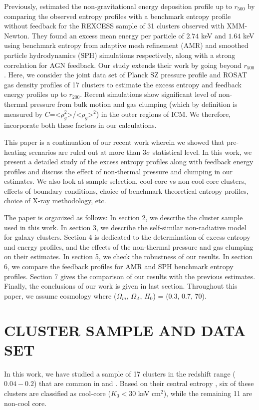 \documentclass[a4paper,fleqn,usenatbib]{mnras}
\begin{document}
Previously, \cite{Chaudhuri2012,Chaudhuri2013} estimated the non-gravitational energy deposition profile up to $r_{500}$
by comparing the observed entropy profiles with a benchmark entropy profile without feedback \citep{Voit2005} for the  REXCESS sample of 31 clusters \citep{10} observed with  XMM-Newton.  They found an excess mean energy per particle of $2.74$ keV and $1.64$ keV using benchmark entropy from adaptive mesh refinement (AMR) and smoothed particle hydrodynamics (SPH) simulations respectively, along with a strong correlation for AGN feedback. Our study extends their work
by going beyond $r_{500}$. Here, we consider the joint data set of Planck SZ pressure profile and  ROSAT gas density profiles of 17 clusters \citep{Eckert2013a,Eckert2013b,Planck2013a} to estimate the excess entropy and feedback energy profiles up to  $r_{200}$.  
Recent simulations show significant level of non-thermal pressure from bulk motion \citep{Rasia2004,Battaglia2012,Shi2015} and gas clumping (which by definition is
measured by $C$=<$\rho_g^2$>/<$\rho_g$>$^2$)  \citep{Nagai2011,Eckert2013a,Eckert2015,Battaglia2015} in the outer regions of ICM. We therefore, incorporate both these factors in our calculations.   

This paper is a continuation of our recent work \cite{Iqbal2016a} wherein we showed that pre-heating scenarios are ruled 
out at more than 3$\sigma$  statistical level. In this work, we present a detailed study of the excess entropy profiles along with feedback energy profiles and discuss the effect of non-thermal pressure and clumping in our estimates. We also look at sample selection, cool-core vs non cool-core clusters, effects of boundary conditions, choice of benchmark theoretical entropy profiles, choice of X-ray methodology, etc.

The paper is organized as follows: In section 2, we describe the cluster sample used in this work. In  section 3, we describe the self-similar non-radiative model for galaxy clusters. Section 4 is dedicated to the determination of
excess entropy and energy profiles, and the effects of the non-thermal pressure and gas clumping on their estimates. In  section 5, we check the robustness of our results. In section 6, we compare the feedback profiles for AMR and SPH benchmark entropy profiles. Section 7 gives the comparison of our results with the previous estimates. Finally, the conclusions of our work is given in last section.  Throughout this paper, we assume cosmology where ($\Omega_m$, $\Omega_{\Lambda}$, $H_0$) = (0.3, 0.7, 70).
\section{CLUSTER SAMPLE AND DATA SET}
In this work, we have studied a sample of 17 clusters in the redshift range ($0.04-0.2$) that are common in \cite{Planck2013a} and \cite{Eckert2012}. 
Based on their central entropy \citep{Cavagnolo2009}, six of these clusters are classified as cool-core ($ K_0 < 30$ keV cm$^2$), while the remaining 11 are non-cool core. 
\end{document}
